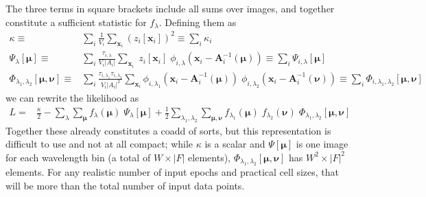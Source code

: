 \documentclass[DM,authoryear,toc]{lsstdoc}
\begin{document}
The three terms in square brackets include all sums over images, and together constitute a sufficient statistic for $f_\lambda$.
Defining them as
\begin{align}
    \kappa \equiv &
        \sum_{i}
            \frac{1}{V_i}
        \sum_{\bm{x}_i}
            \left(z_i[\bm{x}_i]\right)^2
        \equiv \sum_{i} \kappa_i
    \\
    \Psi_{\lambda}[\bm{\mu}] \equiv &
        \sum_{i}
        \frac{\tau_{i,\lambda}}{V_i |A_i|}
        \sum_{\bm{x}_i}
            \; z_i[\bm{x}_i]
            \; \phi_{i,\lambda}\!\left(
                \bm{x}_i - \bm{A}_i^{-1}(\bm{\mu})
            \right)
        \equiv \sum_{i} \Psi_{i,\lambda}[\bm{\mu}]
    \\
    \Phi_{\lambda_1,\lambda_2}[\bm{\mu},\bm{\nu}] \equiv &
        \sum_{i}
            \frac{
                \tau_{i,\lambda_1}
                \tau_{i,\lambda_2}
            }{
                V_i |A_i|^2
            }
        \sum_{\bm{x}_i}
            \phi_{i,\lambda_1}\!\left(
                    \bm{x}_i - \bm{A}_i^{-1}(\bm{\mu})
            \right)
            \; \phi_{i,\lambda_2}\!\left(
                \bm{x}_i - \bm{A}_i^{-1}(\bm{\nu})
            \right)
    \equiv \sum_{i} \Phi_{i,\lambda_1,\lambda_2}[\bm{\mu},\bm{\nu}]
\end{align}
we can rewrite the likelihood as
\begin{align}
L =&
    \frac{\kappa}{2}
-
    \sum_{\lambda}
    \sum_{\bm{\mu}}
    f_{\lambda}(\bm{\mu})
    \;\Psi_{\lambda}[\bm{\mu}]
+
    \frac{1}{2}
    \sum_{\lambda_1,\lambda_2}
    \sum_{\bm{\mu},\bm{\nu}}
    f_{\lambda_1}(\bm{\mu}) \;
    f_{\lambda_2}(\bm{\nu}) \;
    \Phi_{\lambda_1,\lambda_2}[\bm{\mu},\bm{\nu}]
\end{align}
Together these already constitutes a coadd of sorts, but this representation is difficult to use and not at all compact; while $\kappa$ is a scalar and $\Psi[\bm{\mu}]$ is one image for each wavelength bin (a total of $W\times|F|$ elements), $\Phi_{\lambda_1,\lambda_2}[\bm{\mu},\bm{\nu}]$ has $W^2 \times |F|^2$ elements.
For any realistic number of input epochs and practical cell sizes, that will be more than the total number of input data points.
\end{document}
